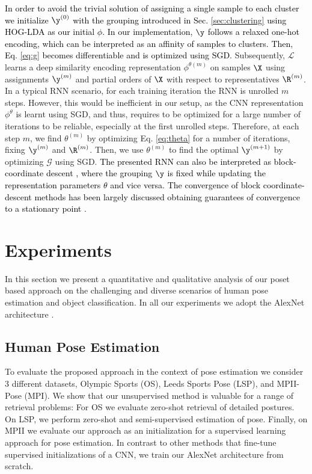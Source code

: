 \documentclass[10pt,twocolumn,letterpaper]{article}
\begin{document}
\textcolor{black}{In order to avoid the trivial solution of assigning a single sample to each cluster we initialize $\y^{(0)}$ with the grouping introduced in Sec. \ref{sec:clustering} using HOG-LDA as our initial $\phi$. In our implementation, $\y$ follows a relaxed one-hot encoding, which can be interpreted as an affinity of samples to clusters. Then, Eq. \eqref{eq:g} becomes differentiable and is optimized using SGD.} Subsequently, $\mathcal{L}$ learns a deep similarity encoding representation $\phi^{\theta{(m)}}$ on samples $\X$ using assignments $\y^{(m)}$ and partial orders of $\X$ with respect to representatives $\R^{(m)}$. In a typical RNN scenario, for each training iteration the RNN is unrolled $m$ steps. However, this would be inefficient in our setup, as the CNN representation $\phi^\theta$ is learnt using SGD, and thus, requires to be optimized for a large number of iterations to be reliable, especially at the first unrolled steps. Therefore, at each step $m$, we find $\theta^{(m)}$ by optimizing Eq. \eqref{eq:theta} for a number of iterations, fixing $\y^{(m)}$ and $\R^{(m)}$. Then, we use $\theta^{(m)}$ to find the optimal $\y^{(m+1)}$ by optimizing $\mathcal{G}$ using SGD. \textcolor{black}{The presented RNN can also be interpreted as block-coordinate descent \cite{blockcd}, where the grouping $\y$ is fixed while updating the representation parameters $\theta$ and vice versa. The convergence of block coordinate-descent methods has been largely discussed obtaining guarantees of convergence to a stationary point \cite{convergence,convergence2}.}

\section{Experiments}\label{sec:experiments}

In this section we present a quantitative and qualitative analysis of our poset based approach on the challenging and diverse scenarios of human pose estimation and object classification. In all our experiments we adopt the AlexNet architecture \cite{alexnet}.

\subsection{Human Pose Estimation}

To evaluate the proposed approach in the context of pose estimation we consider $3$ different datasets, Olympic Sports (OS), Leeds Sports Pose (LSP), and MPII-Pose (MPI). We show that our unsupervised method is valuable for a range of retrieval problems: For OS we evaluate zero-shot retrieval of detailed postures. On LSP, we perform zero-shot and semi-supervised estimation of pose. Finally, on MPII we evaluate our approach as an initialization for a supervised learning approach for pose estimation. In contrast to other methods that fine-tune supervised initializations of a CNN, we train our AlexNet \cite{alexnet} architecture from scratch.
\end{document}

